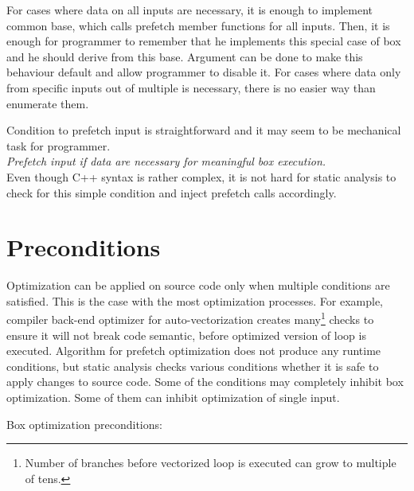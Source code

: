 For cases where data on all inputs are necessary, it is enough to implement common base, which calls prefetch member functions for all inputs. Then, it is enough for programmer to remember that he implements this special case of box and he should derive from this base. Argument can be done to make this behaviour default and allow programmer to disable it. For cases where data only from specific inputs out of multiple is necessary, there is no easier way than enumerate them.

Condition to prefetch input is straightforward and it may seem to be mechanical task for programmer.\\

\emph{Prefetch input if data are necessary for meaningful box execution.}
\\

\noindent Even though C++ syntax is rather complex, it is not hard for static analysis to check for this simple condition and inject prefetch calls accordingly.

\section{Preconditions}
\label{prefetch-preconditions}
Optimization can be applied on source code only when multiple conditions are satisfied. This is the case with the most optimization processes. For example, compiler back-end optimizer for auto-vectorization creates many\footnote{Number of branches before vectorized loop is executed can grow to multiple of tens.} checks to ensure it will not break code semantic, before optimized version of loop is executed. Algorithm for prefetch optimization does not produce any runtime conditions, but static analysis checks various conditions whether it is safe to apply changes to source code. Some of the conditions may completely inhibit box optimization. Some of them can inhibit optimization of single input.

Box optimization preconditions:

